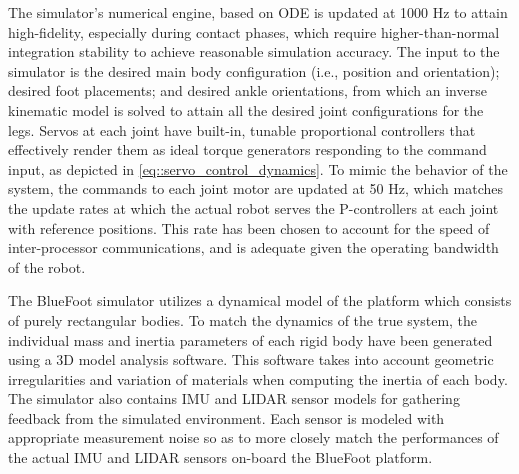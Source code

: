 		The simulator's numerical engine, based on ODE is updated at 1000 Hz to attain high-fidelity, especially during contact phases, which require higher-than-normal integration stability to achieve reasonable  simulation accuracy. The input to the simulator is the desired main body configuration (i.e., position and orientation); desired foot placements; and desired ankle orientations, from which an inverse kinematic model is solved to attain all the desired joint configurations for the legs. Servos at each joint have built-in, tunable proportional controllers that effectively render them as ideal torque generators responding to the command input, as depicted in \ref{eq::servo_control_dynamics}. To mimic the behavior of the system, the commands to each joint motor are updated at 50 Hz, which matches the update rates at which the actual robot serves the P-controllers at each joint with reference positions. This rate has been chosen to account for the speed of inter-processor communications, and is adequate given the operating bandwidth of the robot.
		
		The BlueFoot simulator utilizes a dynamical model of the platform which consists of purely rectangular bodies. To match the dynamics of the true system, the individual mass and inertia parameters of each rigid body have been generated using a 3D model analysis software. This software takes into account geometric irregularities and variation of materials when computing the inertia of each body. The simulator also contains IMU and LIDAR sensor models for gathering feedback from the simulated environment. Each sensor is modeled with appropriate measurement noise so as to more closely match the performances of the actual IMU and LIDAR sensors on-board the BlueFoot platform.

